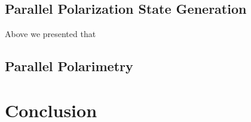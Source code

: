 \documentclass[footinbib,aps,prl,twocolumn,superscriptaddress]{revtex4-1}
\begin{document}
\subsection{Parallel Polarization State Generation}

Above we presented that 

\subsection{Parallel Polarimetry}

\section{Conclusion}


%


\end{document}
